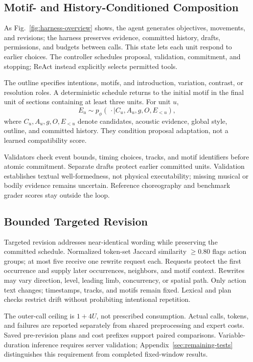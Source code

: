 \subsection{Motif- and History-Conditioned Composition}
As Fig.~\ref{fig:harness-overview} shows, the agent generates objectives, movements, and revisions; the harness preserves evidence, committed history, drafts, permissions, and budgets between calls. This state lets each unit respond to earlier choices. The controller schedules proposal, validation, commitment, and stopping; ReAct instead explicitly selects permitted tools.

The outline specifies intentions, motifs, and introduction, variation, contrast, or resolution roles. A deterministic schedule returns to the initial motif in the final unit of sections containing at least three units. For unit $u$,
\begin{equation}
 E_u\sim p_\phi(\,\cdot\mid C_u,A_u,g,O,E_{<u}),
\end{equation}
where $C_u,A_u,g,O,E_{<u}$ denote candidates, acoustic evidence, global style, outline, and committed history. They condition proposal adaptation, not a learned compatibility score.

Validators check event bounds, timing choices, tracks, and motif identifiers before atomic commitment. Separate drafts protect earlier committed units. Validation establishes textual well-formedness, not physical executability; missing musical or bodily evidence remains uncertain. Reference choreography and benchmark grader scores stay outside the loop.

\subsection{Bounded Targeted Revision}
Targeted revision addresses near-identical wording while preserving the committed schedule. Normalized token-set Jaccard similarity $\geq0.80$ flags action groups; at most five receive one rewrite request each. Requests protect the first occurrence and supply later occurrences, neighbors, and motif context. Rewrites may vary direction, level, leading limb, concurrency, or spatial path. Only action text changes; timestamps, tracks, and motifs remain fixed. Lexical and plan checks restrict drift without prohibiting intentional repetition.

The outer-call ceiling is $1+4U$, not prescribed consumption. Actual calls, tokens, and failures are reported separately from shared preprocessing and expert costs. Saved pre-revision plans and cost prefixes support paired comparisons. Variable-duration inference requires server validation; Appendix~\ref{sec:remaining-tests} distinguishes this requirement from completed fixed-window results.
